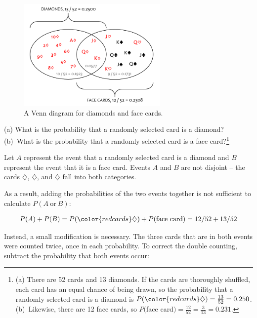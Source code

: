 \begin{figure}[h]
	\centering
	\includegraphics[width=0.65\textwidth]{ch_probability_oi_biostat/figures/cardsDiamondFaceVenn/cardsDiamondFaceVenn.png}
	\caption{A Venn diagram for diamonds and face cards.}
	\label{fig:cardsDiamondFaceVenn}
\end{figure}


\begin{exercise}
	(a) What is the probability that a randomly selected card is a diamond? (b)~What is the probability that a randomly selected card is a face card?\footnote{(a) There are 52 cards and 13 diamonds. If the cards are thoroughly shuffled, each card has an equal chance of being drawn, so the probability that a randomly selected card is a diamond is $P({\color{redcards}\diamondsuit}) = \frac{13}{52} = 0.250$. (b)~Likewise, there are 12 face cards, so $P($face card$) = \frac{12}{52} = \frac{3}{13} = 0.231$.}
\end{exercise}

Let $A$ represent the event that a randomly selected card is a diamond and $B$ represent the event that it is a face card. Events $A$ and $B$ are not disjoint -- the cards {\color{redcards}$\diamondsuit$}, {\color{redcards}$\diamondsuit$}, and {\color{redcards}$\diamondsuit$} fall into both categories. 

As a result, adding the probabilities of the two events together is not sufficient to calculate $P(A \ \text{or} \ B)$:

\begin{eqnarray*}
	P(A) + P(B) = P({\color{redcards}\diamondsuit}) + P(\text{face card}) = 12/52 + 13/52
	\label{overCountFaceDiamond}
\end{eqnarray*}

Instead, a small modification is necessary. The three cards that are in both events were counted twice, once in each probability. To correct the double counting, subtract the probability that both events occur:


